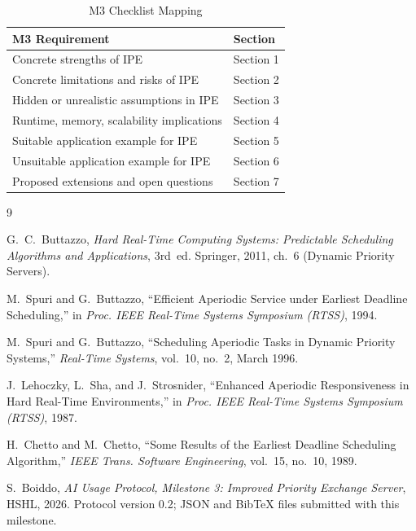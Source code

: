 \documentclass[conference]{IEEEtran}
\begin{document}
\begin{table}[h]
\centering
\caption{M3 Checklist Mapping}
\renewcommand{\arraystretch}{1.3}
\begin{tabular}{|p{5.5cm}|p{2.0cm}|}
\hline
\textbf{M3 Requirement} & \textbf{Section} \\
\hline
Concrete strengths of IPE & Section 1 \\
\hline
Concrete limitations and risks of IPE & Section 2 \\
\hline
Hidden or unrealistic assumptions in IPE & Section 3 \\
\hline
Runtime, memory, scalability implications & Section 4 \\
\hline
Suitable application example for IPE & Section 5 \\
\hline
Unsuitable application example for IPE & Section 6 \\
\hline
Proposed extensions and open questions & Section 7 \\
\hline
\end{tabular}
\end{table}


\begin{thebibliography}{9}

G.~C.~Buttazzo,
\textit{Hard Real-Time Computing Systems: Predictable Scheduling Algorithms
and Applications}, 3rd~ed.
Springer, 2011, ch.~6 (Dynamic Priority Servers).

M.~Spuri and G.~Buttazzo,
``Efficient Aperiodic Service under Earliest Deadline Scheduling,''
in \textit{Proc. IEEE Real-Time Systems Symposium (RTSS)}, 1994.

M.~Spuri and G.~Buttazzo,
``Scheduling Aperiodic Tasks in Dynamic Priority Systems,''
\textit{Real-Time Systems}, vol.~10, no.~2, March 1996.

J.~Lehoczky, L.~Sha, and J.~Strosnider,
``Enhanced Aperiodic Responsiveness in Hard Real-Time Environments,''
in \textit{Proc. IEEE Real-Time Systems Symposium (RTSS)}, 1987.

H.~Chetto and M.~Chetto,
``Some Results of the Earliest Deadline Scheduling Algorithm,''
\textit{IEEE Trans. Software Engineering}, vol.~15, no.~10, 1989.

S.~Boiddo,
\textit{AI Usage Protocol, Milestone 3: Improved Priority Exchange Server},
HSHL, 2026. Protocol version 0.2; JSON and BibTeX files submitted with this
milestone.

\end{thebibliography}
\end{document}
